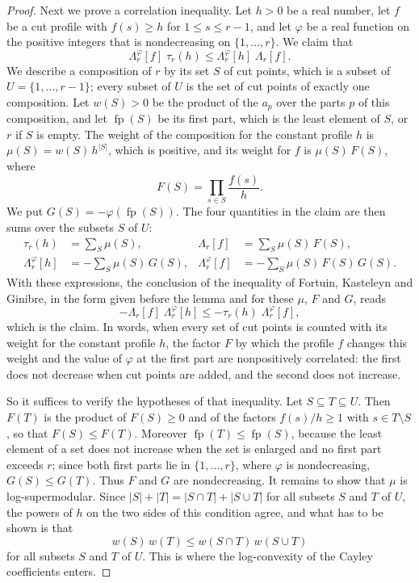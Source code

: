 \documentclass{amsart}
\theoremstyle{definition}
\theoremstyle{remark}
\numberwithin{equation}{section}
\begin{document}
\begin{proof}
Next we prove a correlation inequality. Let $h>0$ be a real number, let $f$ be a cut profile with $f(s)\ge h$ for $1\le s\le r-1$, and let $\varphi$ be a real function on the positive integers that is nondecreasing on $\{1,\dots,r\}$. We claim that
\begin{equation}\label{eq:chains-correlation}
\Lambda^{\varphi}_r[f]\;\tau_r(h)\le\Lambda^{\varphi}_r[h]\;\Lambda_r[f].
\end{equation}
We describe a composition of $r$ by its set $S$ of cut points, which is a subset of $U=\{1,\dots,r-1\}$; every subset of $U$ is the set of cut points of exactly one composition. Let $w(S)>0$ be the product of the $a_p$ over the parts $p$ of this composition, and let $\operatorname{fp}(S)$ be its first part, which is the least element of $S$, or $r$ if $S$ is empty. The weight of the composition for the constant profile $h$ is $\mu(S)=w(S)\,h^{|S|}$, which is positive, and its weight for $f$ is $\mu(S)\,F(S)$, where
\[
F(S)=\prod_{s\in S}\frac{f(s)}{h}.
\]
We put $G(S)=-\varphi(\operatorname{fp}(S))$. The four quantities in the claim are then sums over the subsets $S$ of $U$:
\begin{align*}
\tau_r(h)&=\sum_{S}\mu(S), & \Lambda_r[f]&=\sum_{S}\mu(S)\,F(S),\\
\Lambda^{\varphi}_r[h]&=-\sum_{S}\mu(S)\,G(S), & \Lambda^{\varphi}_r[f]&=-\sum_{S}\mu(S)\,F(S)\,G(S).
\end{align*}
With these expressions, the conclusion of the inequality of Fortuin, Kasteleyn and Ginibre, in the form given before the lemma and for these $\mu$, $F$ and $G$, reads
\[
-\Lambda_r[f]\;\Lambda^{\varphi}_r[h]\le-\tau_r(h)\;\Lambda^{\varphi}_r[f],
\]
which is the claim. In words, when every set of cut points is counted with its weight for the constant profile $h$, the factor $F$ by which the profile $f$ changes this weight and the value of $\varphi$ at the first part are nonpositively correlated: the first does not decrease when cut points are added, and the second does not increase.

So it suffices to verify the hypotheses of that inequality. Let $S\subseteq T\subseteq U$. Then $F(T)$ is the product of $F(S)\ge 0$ and of the factors $f(s)/h\ge 1$ with $s\in T\setminus S$, so that $F(S)\le F(T)$. Moreover $\operatorname{fp}(T)\le\operatorname{fp}(S)$, because the least element of a set does not increase when the set is enlarged and no first part exceeds $r$; since both first parts lie in $\{1,\dots,r\}$, where $\varphi$ is nondecreasing, $G(S)\le G(T)$. Thus $F$ and $G$ are nondecreasing. It remains to show that $\mu$ is log-supermodular. Since $|S|+|T|=|S\cap T|+|S\cup T|$ for all subsets $S$ and $T$ of $U$, the powers of $h$ on the two sides of this condition agree, and what has to be shown is that
\[
w(S)\,w(T)\le w(S\cap T)\,w(S\cup T)
\]
for all subsets $S$ and $T$ of $U$. This is where the log-convexity of the Cayley coefficients enters.


\end{proof}
\end{document}
